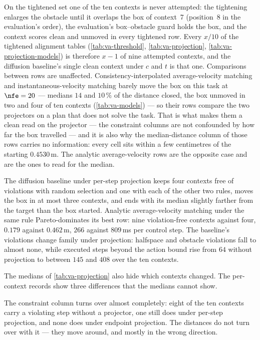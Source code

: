 On the tightened set one of the ten contexts is never attempted: the tightening enlarges the
obstacle until it overlaps the box of context~7 (position~8 in the evaluation's order), the evaluation's
box--obstacle guard holds the box, and
the context scores clean and unmoved in every tightened row. Every $x/10$ of the tightened alignment tables
(\autoref{tab:va-threshold}, \autoref{tab:va-projection}, \autoref{tab:va-projection-models}) is therefore
$x-1$ of nine attempted contexts, and the diffusion baseline's single clean context under $c$ and $t$ is
that one. Comparisons between rows are unaffected.
Consistency-interpolated average-velocity matching and instantaneous-velocity matching barely
move the box on this task at $\nfe=20$ --- medians $14$ and $10\,\%$ of the distance closed, the box unmoved
in two and four of ten contexts (\autoref{tab:va-models}) --- so their rows compare the two
projectors on a plan that does not solve the task. That is what makes them a clean read on the
projector --- the constraint columns are not confounded by how far the box travelled --- and it is also
why the median-distance column of those rows carries no information: every cell sits within a few
centimetres of the starting $0.4530$\,m. The analytic average-velocity rows are the opposite case and are
the ones to read for the median.

The diffusion baseline under per-step projection keeps four contexts free of violations with random
selection and one with each of the other two rules, moves the box in at most three contexts, and ends with
its median slightly farther from the target than the box started. Analytic average-velocity matching under
the same rule Pareto-dominates its best row: nine violation-free contexts against four, $0.179$ against $0.462$\,m,
$266$ against $809$\,ms per control step. The baseline's violations change family under projection:
halfspace and obstacle violations fall to almost none, while executed steps beyond the action bound rise
from $64$ without projection to between $145$ and $408$ over the ten contexts.

The medians of \autoref{tab:va-projection} also hide which contexts changed. The per-context records
show three differences that the medians cannot show.

The constraint column turns over almost completely: eight of the ten contexts carry a violating step
without a projector, one still does under per-step projection, and none does under endpoint projection.
The distances do not turn over with it --- they move around, and mostly in the wrong direction.

